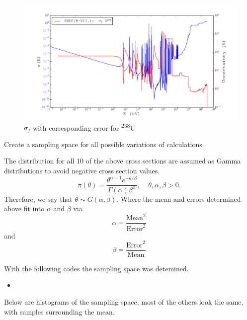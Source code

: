 \documentclass[11pt,notitlepage]{article}
\newcommand{\tss}{\textsuperscript}
\newcommand{\pythonscript}[2]{
\begin{itemize}
\item[]
\end{itemize}
}
\newcommand{\cmark}{\ding{51}}%
\newcommand{\done}{\rlap{$\square$}{\raisebox{2pt}{\large\hspace{1pt}\cmark}}%
  \hspace{-2.5pt}}
\begin{document}
\begin{todolist}
  \begin{figure}[H]
    \begin{center}
      \includegraphics[width=0.9\columnwidth]{../Weighting/X_Sections/XwVar_U_238_92_f.pdf}
      \vspace{-5mm}
      \caption{$\sigma_f$ with corresponding error for \tss{238}U}
      \label{fig:XU238}
    \end{center}
  \end{figure}

  
    
\item[\done]{Create a sampling space for all possible variations of
  calculations}

  The distribution for all 10 of the above cross sections are
  assumed as Gamma distributions to avoid negative cross section
  values.
  \begin{equation*}
    \pi(\theta)=\frac{\theta^{\alpha-1}e^{-\theta/\beta}}{\Gamma(\alpha)
      \beta^{\alpha}},\ \ \ \ \ \theta,\alpha,\beta>0.
  \end{equation*}
  Therefore, we say that $\theta\sim G(\alpha,\beta)$. Where the mean
  and errors determined above fit into $\alpha$ and $\beta$ via
  \begin{equation*}
    \alpha=\frac{\text{Mean}^2}{\text{Error}^2}
  \end{equation*}
  and
  \begin{equation*}
    \beta=\frac{\text{Error}^2}{\text{Mean}}
  \end{equation*}
  
  
  With the following codes the sampling space was detemined.

  
  \pythonscript{../Origen2/SampleGen}{Sample Generation code}


  Below are histograms of the sampling space, most of the others look
  the same, with samples surrounding the mean.
  

\end{todolist}
\end{document}
